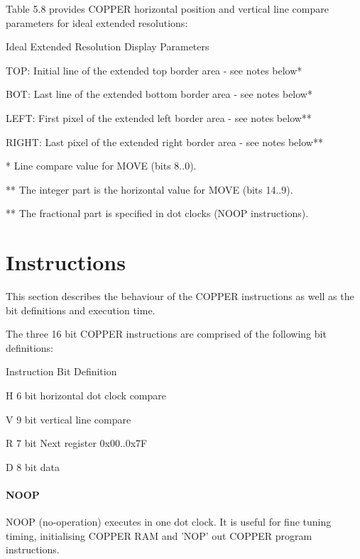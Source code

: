 Table 5.8 provides COPPER horizontal position and vertical
line compare parameters for ideal extended resolutions:

\begin{table}[ht]\centering\small
  \caption{Ideal Extended Resolution Display Parameters}

  \raggedright TOP: Initial line of the extended top border area - see notes below*

  BOT: Last line of the extended bottom border area - see notes below*

  LEFT: First pixel of the extended left border area - see notes below**

  RIGHT: Last pixel of the extended right border area - see notes below**

  * Line compare value for MOVE (bits 8..0).

  ** The integer part is the horizontal value for MOVE (bits 14..9).

  ** The fractional part is specified in dot clocks (NOOP instructions).
\end{table}

\section{Instructions}

This section describes the behaviour of the COPPER instructions as
well as the bit definitions and execution time.

The three 16 bit COPPER instructions are comprised of the following
bit definitions:

\begin{table}[ht]\centering
  \caption{Instruction Bit Definition}

  \raggedright H   6 bit horizontal dot clock compare

  V   9 bit vertical line compare

  R   7 bit Next register 0x00..0x7F

  D   8 bit data
\end{table}
\paragraph{NOOP}

NOOP (no-operation) executes in one dot clock. It is useful for fine
tuning timing, initialising COPPER RAM and 'NOP' out COPPER program
instructions.

